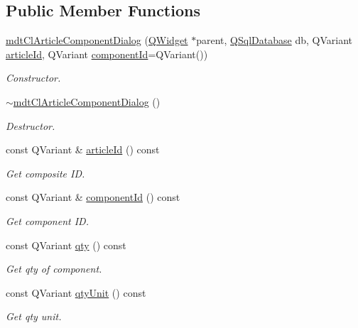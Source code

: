 \subsection*{Public Member Functions}
\begin{DoxyCompactItemize}
\item 
\hyperlink{classmdt_cl_article_component_dialog_a293d48a40384b4e6b545907473ad54a4}{mdt\-Cl\-Article\-Component\-Dialog} (\hyperlink{class_q_widget}{Q\-Widget} $\ast$parent, \hyperlink{class_q_sql_database}{Q\-Sql\-Database} db, Q\-Variant \hyperlink{classmdt_cl_article_component_dialog_a71ba3f37673877ef16680d8d6568799c}{article\-Id}, Q\-Variant \hyperlink{classmdt_cl_article_component_dialog_ab95b190a2bcd240266134942b74d8c45}{component\-Id}=Q\-Variant())
\begin{DoxyCompactList}\small\item\em Constructor. \end{DoxyCompactList}\item 
\hyperlink{classmdt_cl_article_component_dialog_a5ec276610871f18bc0ed2fab6f219c04}{$\sim$mdt\-Cl\-Article\-Component\-Dialog} ()
\begin{DoxyCompactList}\small\item\em Destructor. \end{DoxyCompactList}\item 
const Q\-Variant \& \hyperlink{classmdt_cl_article_component_dialog_a71ba3f37673877ef16680d8d6568799c}{article\-Id} () const 
\begin{DoxyCompactList}\small\item\em Get composite I\-D. \end{DoxyCompactList}\item 
const Q\-Variant \& \hyperlink{classmdt_cl_article_component_dialog_ab95b190a2bcd240266134942b74d8c45}{component\-Id} () const 
\begin{DoxyCompactList}\small\item\em Get component I\-D. \end{DoxyCompactList}\item 
const Q\-Variant \hyperlink{classmdt_cl_article_component_dialog_a66881d6c4d4d8791bd5e29b127c913db}{qty} () const 
\begin{DoxyCompactList}\small\item\em Get qty of component. \end{DoxyCompactList}\item 
const Q\-Variant \hyperlink{classmdt_cl_article_component_dialog_a799575d51b0a2e80985bab8e25d9c5da}{qty\-Unit} () const 
\begin{DoxyCompactList}\small\item\em Get qty unit. \end{DoxyCompactList}\end{DoxyCompactItemize}


